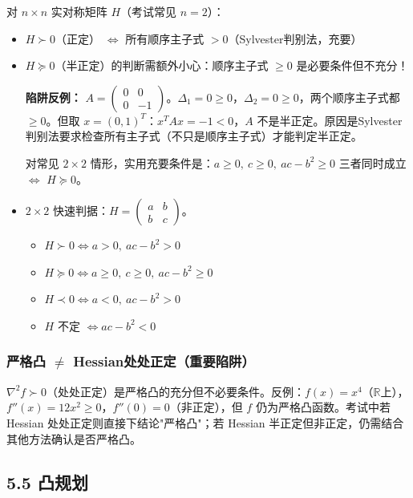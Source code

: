 对 $n\times n$ 实对称矩阵 $H$（考试常见 $n=2$）：
\begin{itemize}
  \item $H \succ 0$（正定） $\Longleftrightarrow$ 所有顺序主子式 $> 0$（Sylvester判别法，充要）
  \item $H \succeq 0$（半正定）的判断需额外小心：顺序主子式 $\ge 0$ 是必要条件但不充分！

  \textbf{陷阱反例：} $A=\begin{pmatrix}0&0\\0&-1\end{pmatrix}$。$\Delta_1=0\ge0$，$\Delta_2=0\ge0$，两个顺序主子式都 $\ge0$。但取 $x=(0,1)^T$：$x^T A x = -1 < 0$，$A$ 不是半正定。原因是Sylvester判别法要求检查所有主子式（不只是顺序主子式）才能判定半正定。

  对常见 $2\times2$ 情形，实用充要条件是：$a\ge0,\ c\ge0,\ ac-b^2\ge0$ 三者同时成立 $\Longleftrightarrow$ $H\succeq0$。

  \item $2\times2$ 快速判据：$H=\begin{pmatrix}a&b\\b&c\end{pmatrix}$。
    \begin{itemize}
      \item $H\succ0 \Longleftrightarrow a>0,\ ac-b^2>0$
      \item $H\succeq0 \Longleftrightarrow a\ge0,\ c\ge0,\ ac-b^2\ge0$
      \item $H\prec0 \Longleftrightarrow a<0,\ ac-b^2>0$
      \item $H$ 不定 $\Longleftrightarrow ac-b^2<0$
    \end{itemize}
\end{itemize}

\subsubsection{严格凸 $\neq$ Hessian处处正定（重要陷阱）}

$\nabla^2 f \succ 0$（处处正定）是严格凸的充分但不必要条件。反例：$f(x)=x^4$（$\mathbb{R}$上），$f''(x)=12x^2 \ge 0$，$f''(0)=0$（非正定），但 $f$ 仍为严格凸函数。考试中若 Hessian 处处正定则直接下结论"严格凸"；若 Hessian 半正定但非正定，仍需结合其他方法确认是否严格凸。

\subsection{5.5 凸规划}

